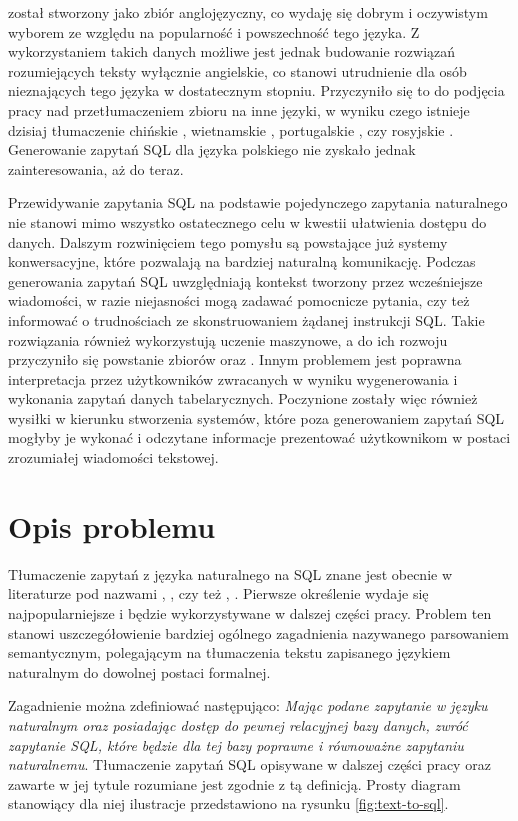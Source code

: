  został stworzony jako zbiór anglojęzyczny, co wydaję się dobrym i oczywistym wyborem ze względu na popularność i powszechność tego języka. Z wykorzystaniem takich danych możliwe jest jednak budowanie rozwiązań rozumiejących teksty wyłącznie angielskie, co stanowi utrudnienie dla osób nieznających tego języka w dostatecznym stopniu. Przyczyniło się to do podjęcia pracy nad przetłumaczeniem zbioru  na inne języki, w wyniku czego istnieje dzisiaj tłumaczenie chińskie , wietnamskie , portugalskie , czy rosyjskie . Generowanie zapytań SQL dla języka polskiego nie zyskało jednak zainteresowania, aż do teraz.

Przewidywanie zapytania SQL na podstawie pojedynczego zapytania naturalnego nie stanowi mimo wszystko ostatecznego celu w kwestii ułatwienia dostępu do danych. Dalszym rozwinięciem tego pomysłu są powstające już systemy konwersacyjne, które pozwalają na bardziej naturalną komunikację. Podczas generowania zapytań SQL uwzględniają kontekst tworzony przez wcześniejsze wiadomości, w razie niejasności mogą zadawać pomocnicze pytania, czy też informować o trudnościach ze skonstruowaniem żądanej instrukcji SQL. Takie rozwiązania również wykorzystują uczenie maszynowe, a do ich rozwoju przyczyniło się powstanie zbiorów   oraz  . Innym problemem jest poprawna interpretacja przez użytkowników zwracanych w wyniku wygenerowania i wykonania zapytań danych tabelarycznych. Poczynione zostały więc również wysiłki w kierunku stworzenia systemów, które poza generowaniem zapytań SQL mogłyby je wykonać i odczytane informacje prezentować użytkownikom w postaci zrozumiałej wiadomości tekstowej.

\section{Opis problemu}
Tłumaczenie zapytań z języka naturalnego na SQL znane jest obecnie w literaturze pod nazwami , , czy też , . Pierwsze określenie wydaje się najpopularniejsze i będzie wykorzystywane w dalszej części pracy. Problem ten stanowi uszczegółowienie bardziej ogólnego zagadnienia nazywanego parsowaniem semantycznym, polegającym na tłumaczenia tekstu zapisanego językiem naturalnym do dowolnej postaci formalnej.

Zagadnienie  można zdefiniować następująco: \textit{Mając podane zapytanie w języku naturalnym oraz posiadając dostęp do pewnej relacyjnej bazy danych, zwróć zapytanie SQL, które będzie dla tej bazy poprawne i równoważne zapytaniu naturalnemu}. Tłumaczenie zapytań SQL opisywane w dalszej części pracy oraz zawarte w jej tytule rozumiane jest zgodnie z tą definicją. Prosty diagram stanowiący dla niej ilustracje przedstawiono na rysunku \ref{fig:text-to-sql}.

